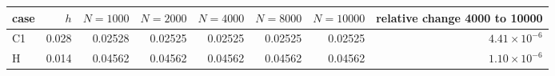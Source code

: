 \begin{tabular}{lrrrrrrr}
\toprule
case & $h$ & $N=1000$ & $N=2000$ & $N=4000$ & $N=8000$ & $N=10000$ & relative change 4000 to 10000 \\
\midrule
C1 & 0.028 & 0.02528 & 0.02525 & 0.02525 & 0.02525 & 0.02525 & $4.41\times10^{-6}$ \\
H & 0.014 & 0.04562 & 0.04562 & 0.04562 & 0.04562 & 0.04562 & $1.10\times10^{-6}$ \\
\bottomrule
\end{tabular}

